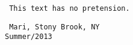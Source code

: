 \begin{acknowledge}
\texttt{
This text has no pretension.
}


\bigskip 

\texttt{
Mari, Stony Brook, NY \\
Summer/2013}


\end{acknowledge}
